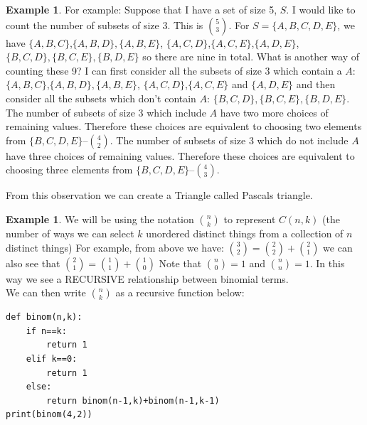 \documentclass[letterpaper,10pt]{article}
\theoremstyle{plain}
\theoremstyle{definition}
\newtheorem{exmp}[thm]{Example}
\theoremstyle{remark}
\begin{document}
\begin{exmp}
For example:
Suppose that I have a set of size 5, $S$. I would like to count the number of subsets of size 3. This is $\binom{5}{3}$.
\newline
For $S=\{A,B,C,D,E\}$, we have 
$\{A,B,C\}$,$\{A,B,D\}, \{A,B,E\}$,
$\{A,C,D\}$,$\{A,C,E\}$,$\{A,D,E\}$,
$\{B,C,D\},\{B,C,E\},\{B,D,E\}$
\newline
so there are nine in total. 
\newline
What is another way of counting these 9?
\newline
I can first consider all the subsets of size 3 which contain a $A$: $\{A,B,C\}$,$\{A,B,D\}, \{A,B,E\}$,
$\{A,C,D\}$,$\{A,C,E\}$ and $\{A,D,E\}$
and then consider all the subsets which don't contain $A$: $\{B,C,D\},\{B,C,E\},\{B,D,E\}$.
\newline
The number of subsets of size 3 which include $A$ have two more choices of remaining values. Therefore these choices are equivalent to choosing two elements from $\{B,C,D,E\}$--$\binom{4}{2}$.
\newline
The number of subsets of size 3 which do not include $A$ have three choices of remaining values. Therefore these choices are equivalent to choosing three elements from $\{B,C,D,E\}$--$\binom{4}{3}$.
\end{exmp}
 From this observation we can create a Triangle called Pascals triangle. 


\begin{exmp}
We will be using the notation $\binom{n}{k}$ to represent $C(n,k)$ (the number of ways we can select $k$ unordered distinct things from a collection of $n$ distinct things)
For example, from above we have:
\newline
$\binom{3}{2}=\binom{2}{2}+\binom{2}{1}$
\newline
we can also see that $\binom{2}{1}=\binom{1}{1}+\binom{1}{0}$
\newline
Note that $\binom{n}{0}=1$ and $\binom{n}{n}=1$.
\newline
In this way we see a RECURSIVE relationship between binomial terms.\\
We can then write $\binom{n}{k}$ as a recursive function below:
\newline
\begin{verbatim}
def binom(n,k):
    if n==k:
        return 1
    elif k==0:
        return 1
    else:
        return binom(n-1,k)+binom(n-1,k-1)
print(binom(4,2))
\end{verbatim}
\end{exmp}
\end{document}

